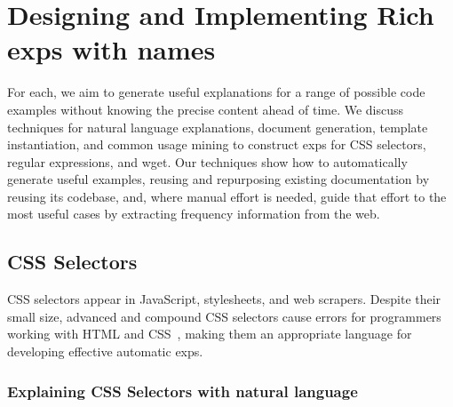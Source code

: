 \section{Designing and Implementing Rich \Glspl{exp} with \Glspl{name}}

For each, we aim to generate useful explanations for a range of possible code examples without knowing the precise content ahead of time. 
We discuss techniques for natural language explanations, document generation, template instantiation, and common usage mining to construct \glspl{exp} for CSS selectors, regular expressions, and wget.
 Our techniques show how to automatically generate useful examples, reusing and repurposing existing documentation by reusing its codebase, and, where manual effort is needed, guide that effort to the most useful cases by extracting frequency information from the web. \fi

\subsection{CSS Selectors}

CSS selectors appear in JavaScript, stylesheets, and web scrapers.
Despite their small size, advanced and compound CSS selectors cause errors for programmers working with HTML and CSS~\cite{park_towards_2013}, making them an appropriate language for developing effective automatic \glspl{exp}.

\subsubsection{Explaining CSS Selectors with natural language}

